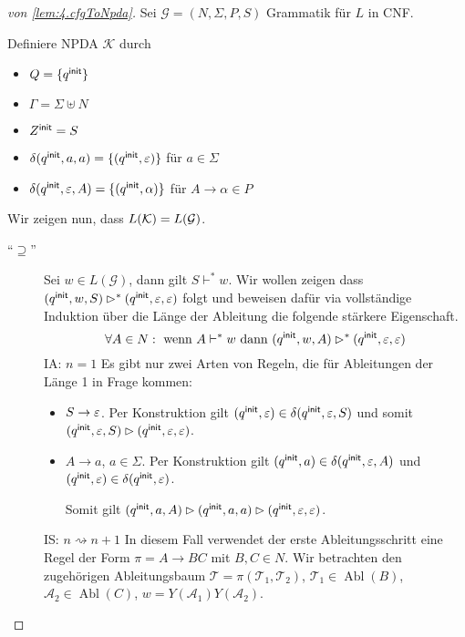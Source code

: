   
\begin{proof}[von \autoref{lem:4.cfgToNpda}]
Sei $\mathcal{G} = (N,\Sigma,P,S)$ Grammatik für $L$ in \ac{CNF}.
    
                Definiere \ac{NPDA} $\mathcal{K}$ durch
                \begin{itemize}
                        \item $Q = \{q^\mathsf{init}\}$ 
                        \item $\Gamma = \Sigma\uplus N$
                        \item $Z^\mathsf{init} = S$
                        \item $\delta(q^\mathsf{init},a,a) = \{(q^\mathsf{init},\varepsilon)\} $ für $ a\in\Sigma$
                        \item $\delta(q^\mathsf{init},\varepsilon,A) = \{(q^\mathsf{init},\alpha)\}$ für $A\to\alpha\in P$
                \end{itemize}
Wir zeigen nun, dass $L(\mathcal{K}) = L(\mathcal{G})$.
\begin{description}
 \item[``$\supseteq$'']
 Sei $w\in L(\mathcal{G})$, dann gilt $S\vdash^* w$.
 Wir wollen zeigen dass $(q^\mathsf{init}, w, S) \rhd^* (q^\mathsf{init}, \varepsilon, \varepsilon)$ folgt und beweisen dafür via vollständige Induktion über die Länge der Ableitung die folgende stärkere Eigenschaft.
     \begin{displaymath}
      \forall A \in N: \text{ wenn } A \vdash^* w\text{ dann } (q^\mathsf{init}, w, A) \rhd^* (q^\mathsf{init}, \varepsilon, \varepsilon)
    \end{displaymath}
  IA: $n=1$ Es gibt nur zwei Arten von Regeln, die für Ableitungen der Länge 1 in Frage kommen:
  \begin{itemize}
        \item $S \to \varepsilon$.
        Per Konstruktion gilt $(q^\mathsf{init}, \varepsilon) \in \delta(q^\mathsf{init}, \varepsilon, S)$ und somit $(q^\mathsf{init}, \varepsilon, S) \rhd (q^\mathsf{init}, \varepsilon, \varepsilon)$.
      \item $A \to a$, $a \in \Sigma$.
        Per Konstruktion gilt $(q^\mathsf{init}, a) \in \delta(q^\mathsf{init}, \varepsilon, A)$ und $(q^\mathsf{init}, \varepsilon) \in \delta(q^\mathsf{init}, \varepsilon)$.

        Somit gilt $(q^\mathsf{init}, a, A) \rhd (q^\mathsf{init}, a, a) \rhd (q^\mathsf{init}, \varepsilon, \varepsilon)$.
   \end{itemize}
   
   IS: $n\rightsquigarrow n+1$ In diesem Fall verwendet der erste Ableitungsschritt eine Regel der Form $\pi = A \to BC$ mit $B,C \in N$.
   Wir betrachten den zugehörigen Ableitungsbaum $\mathcal{T} = \pi(\mathcal{T}_1, \mathcal{T}_2)$, $\mathcal{T}_1 \in \operatorname{Abl}(B)$, $\mathcal{A}_2 \in \operatorname{Abl}(C)$, $w = Y(\mathcal{A}_1)Y(\mathcal{A}_2)$.


\end{description}
\end{proof}

